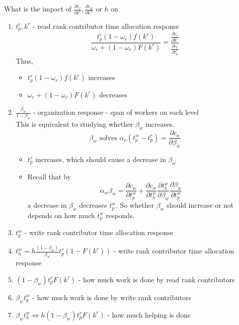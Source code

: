 \documentclass[../main.tex]{subfiles}
\begin{document}
What is the impact of $\frac{\partial c_r}{\partial k^r}, \frac{\partial c_w}{\partial k^w}$ or $h$  on
\begin{enumerate}
    \item $t_p^r, k^r$ - read rank contributor time allocation response\\
    $$\frac{t_p^r(1-\omega_r)f(k^r)}{\omega_r + (1-\omega_r) F(k^r)} = \frac{\frac{\partial c_r}{\partial k^r}}{\frac{\partial c_r}{\partial t_p^r}}$$
    Thus, 
    \begin{itemize}
        \item $t_p^r(1-\omega_r)f(k^r)$ increases
        \item $\omega_r + (1-\omega_r) F(k^r)$ decreases
    \end{itemize}
    \item $\frac{\beta_w}{1-\beta_w}$ - organization response - span of workers on each level\\
    This is equivalent to studying whether $\beta_w$ increases. 
    $$\beta_w \text{ solves } \alpha_o (t_p^w - t_p^r) = \frac{\partial c_o}{\partial \beta_w} $$
    \begin{itemize}
        \item $t_p^r$ increases, which should cause a decrease in $\beta_w$
        \item Recall that by $$\alpha_w \beta_w = \frac{\partial c_w}{\partial t_p^w} + \frac{\partial c_w}{\partial t_h^w}\frac{\partial t_h^w}{\partial \beta_w}\frac{\partial \beta_w}{\partial t_p^w}$$
        a decrease in $\beta_w$ decreases $t_p^w$. So whether $\beta_w$ should increase or not depends on how much $t_p^w$ responds. 
    \end{itemize}
    \item $t_p^w$ - write rank contributor time allocation response
    \item $t_h^w = h \frac{(1-\beta_w)}{\beta_w} t_p^r(1-F(k^r))$ - write rank contributor time allocation response
    \item $(1-\beta_w) t_p^r F(k^r)$ - how much work is done by read rank contributors
    \item $\beta_w t_p^w$ - how much work is done by write rank contributors
    \item $\beta_w t_h^w \iff h (1-\beta_w) t_p^rF(k^r)$ - how much helping is done 
\end{enumerate}
\end{document}

